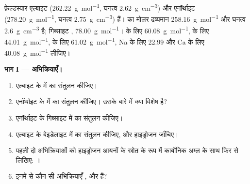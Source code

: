 \begin{problem}
\label{pb:b1:weathering-clays:1}
फ़ेल्डस्पार एल्बाइट  (\qty{262.22}{g.mol^{-1}}, घनत्व \qty{2.62}{g.cm^{-3}}) और एनॉर्थाइट  (\qty{278.20}{g.mol^{-1}}, घनत्व \qty{2.75}{g.cm^{-3}}) हैं।   का मोलर द्रव्यमान \qty{258.16}{g.mol^{-1}} और घनत्व \qty{2.6}{g.cm^{-3}} है; गिब्साइट , \qty{78.00}{g.mol^{-1}}।  के लिए \qty{60.08}{g.mol^{-1}},  के लिए \qty{44.01}{g.mol^{-1}},  के लिए \qty{61.02}{g.mol^{-1}}, Na के लिए \num{22.99} और Ca के लिए \qty{40.08}{g.mol^{-1}} लीजिए।

\medskip
\noindent\textbf{भाग I --- अभिक्रियाएँ।}
\begin{enumerate}
  \item एल्बाइट के  में  का संतुलन कीजिए।
  \item एनॉर्थाइट के  में  का संतुलन कीजिए। उसके बारे में क्या विशेष है?
  \item एनॉर्थाइट के गिब्साइट में  का संतुलन कीजिए।
  \item एल्बाइट के बेइडेलाइट  में  का संतुलन कीजिए, और हाइड्रोजन जाँचिए।
  \item पहली दो अभिक्रियाओं को हाइड्रोजन आयनों के स्रोत के रूप में कार्बोनिक अम्ल के साथ फिर से लिखिए: ।
  \item इनमें से कौन-सी अभिक्रियाएँ ,  और  हैं?
\end{enumerate}


\end{problem}

